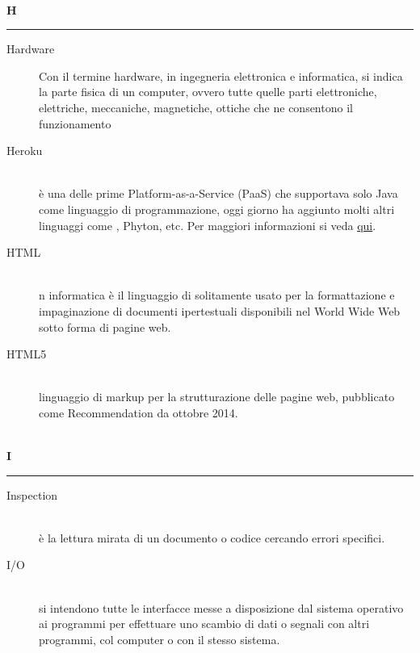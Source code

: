 \documentclass[12pt,a4paper]{article}
\begin{document}
\newpage

\begin{center}
\hfill\\
	\LARGE \textbf{H}
\hfill\\
\rule[15pt]{30pt}{0.5pt}
\end{center}

\begin{description}
\item[Hardware] 
\hfill Con il termine hardware, in ingegneria elettronica e informatica, si indica la parte fisica di un computer, ovvero tutte quelle parti elettroniche, elettriche, meccaniche, magnetiche, ottiche che ne consentono il funzionamento\\	

\item[Heroku] 
\hfill\\ è una  delle prime  Platform-as-a-Service (PaaS) che supportava solo Java come linguaggio di programmazione, oggi giorno ha aggiunto molti altri linguaggi come , Phyton, etc. Per maggiori informazioni si veda \href{https://www.heroku.com}{qui}.

\item[HTML] 
\hfill\\ n informatica è il linguaggio di  solitamente usato per la formattazione e impaginazione di documenti ipertestuali disponibili nel World Wide Web sotto forma di pagine web.

\item[HTML5] 
\hfill\\ linguaggio di markup per la strutturazione delle pagine web, pubblicato come  Recommendation da ottobre 2014.
\end{description}
\newpage

\begin{center}
\hfill\\
	\LARGE \textbf{I}
\hfill\\
\rule[15pt]{30pt}{0.5pt}
\end{center}

\begin{description}
\item[Inspection] 
\hfill\\ è la lettura mirata di un documento o codice cercando errori specifici.

\item[I/O] 
\hfill\\si intendono tutte le interfacce messe a disposizione dal sistema operativo ai programmi per effettuare uno scambio di dati o segnali con altri programmi, col computer o con il stesso sistema.
\end{description}
\end{document}
